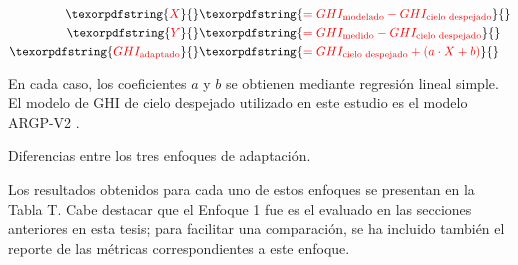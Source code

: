 \documentclass[letterpaper,12pt, twoside]{report}
\providecommand{\DIFdeltex}[1]{{\protect\color{red} \scriptsize #1}} %
\providecommand{\DIFdelFL}[1]{\DIFdel{#1}} %
\providecommand{\DIFdel}[1]{\texorpdfstring{\DIFdeltex{#1}}{}} %
\begin{document}
\begin{align*}
\DIFdel{X }&\DIFdel{= GHI_{\text{modelado}} - GHI_{\text{cielo despejado}} }\\
\DIFdel{Y }&\DIFdel{= GHI_{\text{medido}} - GHI_{\text{cielo despejado}} }\\
\DIFdel{GHI_{\text{adaptado}} }&\DIFdel{= GHI_{\text{cielo despejado}} + (a \cdot X + b)
}\end{align*}%

\DIFdel{En cada caso, los coeficientes $a$ y $b$ se obtienen mediante regresión lineal simple. El modelo de GHI de cielo despejado utilizado en este estudio es el modelo ARGP-V2 \cite{Ledesma2023a}.
}%

{%
\DIFdelFL{Diferencias entre los tres enfoques de adaptación.}}

\DIFdel{Los resultados obtenidos para cada uno de estos enfoques se presentan en la Tabla T. Cabe destacar que el Enfoque 1 fue es el evaluado en las secciones anteriores en esta tesis; para facilitar una comparación, se ha incluido también el reporte de las métricas correspondientes a este enfoque.
}%
\end{document}
